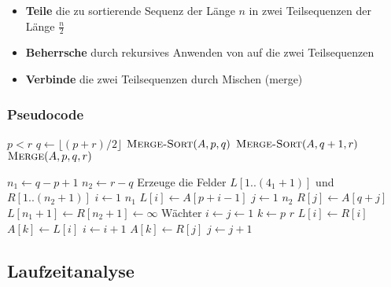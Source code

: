 \documentclass[a4paper]{scrartcl}
\begin{document}
\begin{itemize}
	\item \textbf{Teile} die zu sortierende Sequenz der Länge $n$ in zwei Teilsequenzen der Länge $\frac{n}{2}$
	\item \textbf{Beherrsche} durch rekursives Anwenden von  auf die zwei Teilsequenzen
	\item \textbf{Verbinde} die zwei Teilsequenzen durch Mischen (merge)	
\end{itemize}

\subsubsection*{Pseudocode}

\begin{codebox} 
\li \If $p < r$ 
\li \Then 
        $q \gets \lfloor(p + r) / 2\rfloor$ 
\li     $\textnormal{\scshape Merge-Sort}(A, p, q)$ 
\li     $\textnormal{\scshape Merge-Sort}(A, q+1, r)$ 
\li     $\textnormal{\scshape Merge}(A, p, q, r)$ 
    \End 
\end{codebox} 

\begin{codebox}
\li $n_1 \gets q - p + 1$
\li $n_2 \gets r - q$
\li Erzeuge die Felder $L[1..(4_1 + 1)]$ und $R[1..(n_2 + 1)]$
\li \For $i \gets 1$ \To $n_1$ 
\li     \Do
            $L[i] \gets A[p + i - 1]$
        \End
\li \For $j \gets 1$ \To $n_2$ 
\li     \Do
            $R[j] \gets A[q + j]$
        \End
\li $L[n_1 + 1] \gets R[n_2 + 1] \gets \infty$ \Comment Wächter
\li $i \gets j \gets 1$
\li \For $k \gets p$ \To $r$
\li     \Do \If $L[i] \gets R[i]$
\li         \Then
                $A[k] \gets L[i]$
\li             $i \gets i + 1$
\li         \Else
                $A[k] \gets R[j]$
\li             $j \gets j + 1$
\end{codebox}


\subsection{Laufzeitanalyse}
\end{document}
